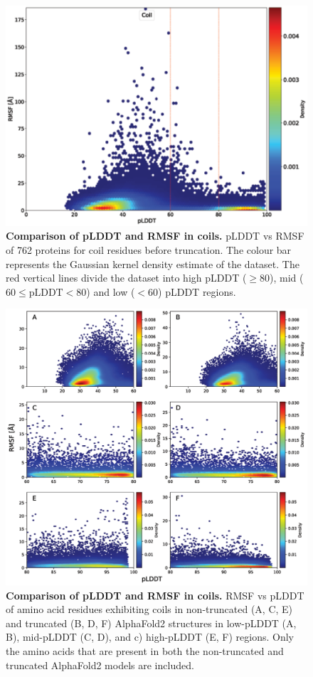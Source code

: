 \begin{figure}[H]
    \centering
    \includegraphics[width=0.75\linewidth]{pLDDT//plddt_figures//supplementary_bhawna/supfig12.pdf}
\caption{\textbf{Comparison of pLDDT and RMSF in coils.} pLDDT vs RMSF of 762 proteins for coil residues before truncation. The colour bar represents the Gaussian kernel density estimate of the dataset. The red vertical lines divide the dataset into high pLDDT ($\geq 80$), mid ($60 \leq \text{pLDDT} < 80$) and low ($< 60$) pLDDT regions.}
    \label{fig:plddt_sup:sup12}
\end{figure}


\begin{figure}[H]
    \centering
    \includegraphics[width=\linewidth]{pLDDT//plddt_figures//supplementary_bhawna/supfig13.pdf}
    \caption{\textbf{Comparison of pLDDT and RMSF in coils.} RMSF vs pLDDT of amino acid residues exhibiting coils in non-truncated (A, C, E) and truncated (B, D, F) AlphaFold2 structures in low-pLDDT (A, B), mid-pLDDT (C, D), and c) high-pLDDT (E, F) regions. Only the amino acids that are present in both the non-truncated and truncated AlphaFold2 models are included.}
    \label{fig:plddt_sup:sup13}
\end{figure}

